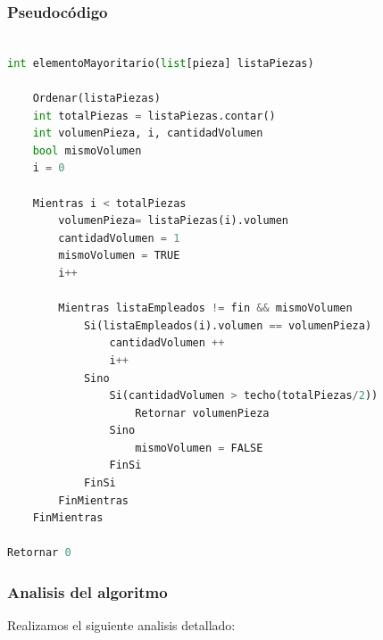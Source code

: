\documentclass{article}
\begin{document}
\subsubsection{Pseudocódigo}

\begin{lstlisting}[language=Python, caption=Algoritmo del proceso B]

int elementoMayoritario(list[pieza] listaPiezas)

    Ordenar(listaPiezas)
    int totalPiezas = listaPiezas.contar()
    int volumenPieza, i, cantidadVolumen
    bool mismoVolumen
    i = 0

    Mientras i < totalPiezas
        volumenPieza= listaPiezas(i).volumen
        cantidadVolumen = 1
        mismoVolumen = TRUE
        i++

        Mientras listaEmpleados != fin && mismoVolumen
            Si(listaEmpleados(i).volumen == volumenPieza)
                cantidadVolumen ++
                i++
            Sino
                Si(cantidadVolumen > techo(totalPiezas/2))
                    Retornar volumenPieza
                Sino
                    mismoVolumen = FALSE
                FinSi
            FinSi
        FinMientras
    FinMientras
	
Retornar 0

\end{lstlisting}

\subsubsection{Analisis del algoritmo}

Realizamos el siguiente analisis detallado:
\end{document}
